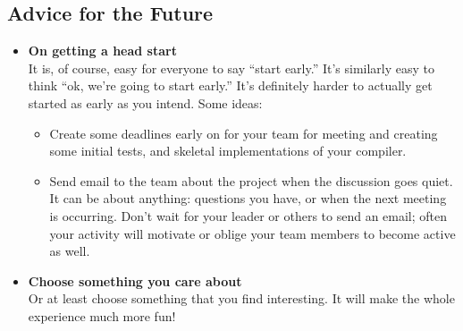 \subsection{Advice for the Future}
\begin{itemize}
\item {\bf On getting a head start}\\
It is, of course, easy for everyone to say ``start early.'' It's similarly easy to think ``ok, we're going to start early.''  It's definitely harder to actually get started as early as you intend. Some ideas:
\begin{itemize}
\item Create some deadlines early on for your team for meeting and creating some initial tests, and skeletal implementations of your compiler. 
\item Send email to the  team about the project when the discussion goes quiet. It can be about anything: questions you have, or when the next meeting is occurring. Don't wait for your leader or others to send an email; often your activity will motivate or oblige your team members to become active as well.
\end{itemize}
\item {\bf Choose something you care about}\\
Or at least choose something that you find interesting. It will make the whole experience much more fun!
\end{itemize}